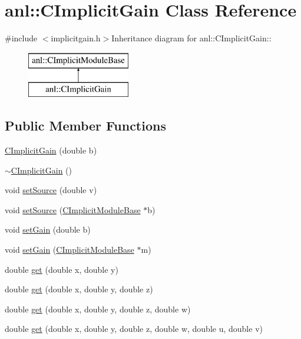 \hypertarget{classanl_1_1CImplicitGain}{
\section{anl::CImplicitGain Class Reference}
\label{classanl_1_1CImplicitGain}
}


{\ttfamily \#include $<$implicitgain.h$>$}Inheritance diagram for anl::CImplicitGain::\begin{figure}[H]
\begin{center}
\leavevmode
\includegraphics[height=2cm]{classanl_1_1CImplicitGain}
\end{center}
\end{figure}
\subsection*{Public Member Functions}
\begin{DoxyCompactItemize}
\item 
\hyperlink{classanl_1_1CImplicitGain_a5ebbb4ec7a16135c9ecad481ccc85ce2}{CImplicitGain} (double b)
\item 
\hyperlink{classanl_1_1CImplicitGain_a156654b778ec4b9ae3c8e43ea53c0c9f}{$\sim$CImplicitGain} ()
\item 
void \hyperlink{classanl_1_1CImplicitGain_a47dd046c2fe9097bf8017aaf2e31760a}{setSource} (double v)
\item 
void \hyperlink{classanl_1_1CImplicitGain_acbdbe734509bc6c3d69290e4187cf9af}{setSource} (\hyperlink{classanl_1_1CImplicitModuleBase}{CImplicitModuleBase} $\ast$b)
\item 
void \hyperlink{classanl_1_1CImplicitGain_a045c26e10435c9a89907a2df59d92481}{setGain} (double b)
\item 
void \hyperlink{classanl_1_1CImplicitGain_a39f85b449cb8e9ace24f8869772cb38f}{setGain} (\hyperlink{classanl_1_1CImplicitModuleBase}{CImplicitModuleBase} $\ast$m)
\item 
double \hyperlink{classanl_1_1CImplicitGain_af51697ea592424db9710d58a251b555e}{get} (double x, double y)
\item 
double \hyperlink{classanl_1_1CImplicitGain_a76cf906f9e4bd4a6346f368951215ca5}{get} (double x, double y, double z)
\item 
double \hyperlink{classanl_1_1CImplicitGain_a2d1715d0d153cc6a6e0a0154484fe90c}{get} (double x, double y, double z, double w)
\item 
double \hyperlink{classanl_1_1CImplicitGain_a018e5eb3dae755a618400bfeb7798c7c}{get} (double x, double y, double z, double w, double u, double v)
\end{DoxyCompactItemize}

